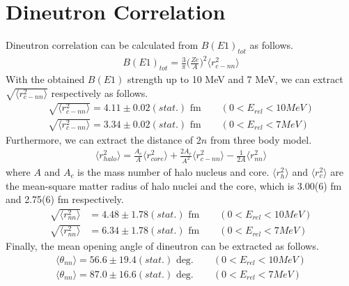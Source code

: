 \section{Dineutron Correlation}
Dineutron correlation can be calculated from $B(E1)_{tot}$ as follows.
\begin{align}
    B(E1)_{tot} = \frac{3}{\pi} \bigg( \frac{Ze}{A} \bigg)^2 \langle r^{2}_{c-nn} \rangle
\end{align}
With the obtained $B(E1)$ strength up to 10 MeV and 7 MeV, we can extract $\sqrt{ \langle r^{2}_{c-nn} \rangle}$ respectively as follows.
\begin{align}
    \sqrt{ \langle r^{2}_{c-nn} \rangle} = 4.11 \pm 0.02 (stat.) \text{ fm} \qquad (0<E_{rel}<10 MeV)\\
    \sqrt{ \langle r^{2}_{c-nn} \rangle} = 3.34 \pm 0.02 (stat.) \text{ fm} \qquad (0<E_{rel}<7 MeV)
\end{align}
Furthermore, we can extract the distance of $2n$ from three body model.
\begin{align}
    \langle r^{2}_{halo} \rangle = \frac{A_c}{A} \langle r^{2}_{core} \rangle + \frac{2A_c}{A^2} \langle r^{2}_{c-nn} \rangle - \frac{1}{2A} \langle r^{2}_{nn} \rangle
\end{align}
where $A$ and $A_c$ is the mass number of halo nucleus and core. $\langle r^{2}_{h} \rangle$ and $\langle r^{2}_{c} \rangle$ are the mean-square matter radius of halo nuclei and the core, which is 3.00(6) fm and 2.75(6) fm respectively.
\begin{align}
    \sqrt{ \langle r^{2}_{nn} \rangle} &= 4.48 \pm 1.78 (stat.) \text{ fm} \qquad (0<E_{rel}<10 MeV)\\
    \sqrt{ \langle r^{2}_{nn} \rangle} &= 6.34 \pm 1.78 (stat.) \text{ fm} \qquad (0<E_{rel}<7 MeV)
\end{align}
Finally, the mean opening angle of dineutron can be extracted as follows.
\begin{align}
    \langle \theta_{nn} \rangle = 56.6 \pm 19.4 (stat.) \text{ deg.} \qquad (0<E_{rel}<10 MeV) \\
    \langle \theta_{nn} \rangle = 87.0 \pm 16.6 (stat.) \text{ deg.}\qquad (0<E_{rel}<7 MeV)
\end{align}